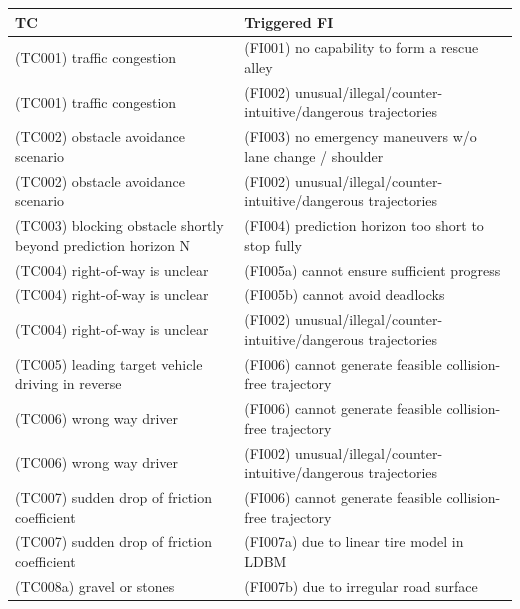 \centering
\renewcommand{\arraystretch}{1.2}
\setlength{\tabcolsep}{4pt}
\begin{longtable}{|p{8cm}|p{8cm}|}
\hline
\textbf{TC} & \textbf{Triggered FI}\\
\hline\hline
\cellcolor{cGreen}(TC001) traffic congestion& \cellcolor{cGray}(FI001) no capability to form a rescue alley\\\hline
\cellcolor{cGreen}(TC001) traffic congestion& \cellcolor{cBlue}(FI002) unusual/illegal/counter-intuitive/dangerous trajectories\\\hline
\cellcolor{cGreen}(TC002) obstacle avoidance scenario& \cellcolor{cGray}(FI003) no emergency maneuvers w/o lane change / shoulder\\\hline
\cellcolor{cGreen}(TC002) obstacle avoidance scenario& \cellcolor{cBlue}(FI002) unusual/illegal/counter-intuitive/dangerous trajectories\\\hline
\cellcolor{cViolet}(TC003) blocking obstacle shortly beyond prediction horizon N& \cellcolor{cBlue}(FI004) prediction horizon too short to stop fully\\\hline
\cellcolor{cYellow}(TC004) right-of-way is unclear& \cellcolor{cBlue}(FI005a) cannot ensure sufficient progress\\\hline
\cellcolor{cYellow}(TC004) right-of-way is unclear& \cellcolor{cBlue}(FI005b) cannot avoid deadlocks\\\hline
\cellcolor{cYellow}(TC004) right-of-way is unclear& \cellcolor{cBlue}(FI002) unusual/illegal/counter-intuitive/dangerous trajectories\\\hline
\cellcolor{cGreen}(TC005) leading target vehicle driving in reverse& \cellcolor{cBlue}(FI006) cannot generate feasible collision-free trajectory\\\hline
\cellcolor{cGreen}(TC006) wrong way driver& \cellcolor{cBlue}(FI006) cannot generate feasible collision-free trajectory\\\hline
\cellcolor{cGreen}(TC006) wrong way driver& \cellcolor{cBlue}(FI002) unusual/illegal/counter-intuitive/dangerous trajectories\\\hline
\cellcolor{cRed}(TC007) sudden drop of friction coefficient& \cellcolor{cBlue}(FI006) cannot generate feasible collision-free trajectory\\\hline
\cellcolor{cRed}(TC007) sudden drop of friction coefficient& \cellcolor{cBlue}(FI007a) due to linear tire model in LDBM\\\hline
\cellcolor{cRed}(TC008a) gravel or stones& \cellcolor{cBlue}(FI007b) due to irregular road surface\\\hline

\end{longtable}
